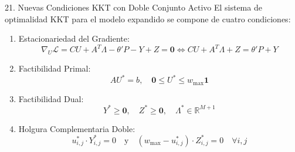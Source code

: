 \documentclass[aspectratio=169,10pt]{beamer}
\begin{document}
\begin{frame}{21. Nuevas Condiciones KKT con Doble Conjunto Activo}
  El sistema de optimalidad KKT para el modelo expandido se compone de cuatro condiciones:
  \vspace{0.2cm}
  \begin{enumerate}
    \item Estacionariedad del Gradiente:
    \begin{equation*}
      \nabla_U \mathcal{L} = C U + A^T \Lambda - \theta' P - Y + Z = \mathbf{0} \iff C U + A^T \Lambda + Z = \theta' P + Y
    \end{equation*}
    \vspace{0.1cm}
    \item Factibilidad Primal:
    \begin{equation*}
      A U^* = b, \quad \mathbf{0} \le U^* \le w_{\max} \mathbf{1}
    \end{equation*}
    \vspace{0.1cm}
    \item Factibilidad Dual:
    \begin{equation*}
      Y^* \ge \mathbf{0}, \quad Z^* \ge \mathbf{0}, \quad \Lambda^* \in \mathbb{R}^{M+1}
    \end{equation*}
    \vspace{0.1cm}
    \item Holgura Complementaria Doble:
    \begin{equation*}
      u_{i,j}^* \cdot Y_{i,j}^* = 0 \quad \text{y} \quad (w_{\max} - u_{i,j}^*) \cdot Z_{i,j}^* = 0 \quad \forall i, j
    \end{equation*}
  \end{enumerate}
\end{frame}
\end{document}
